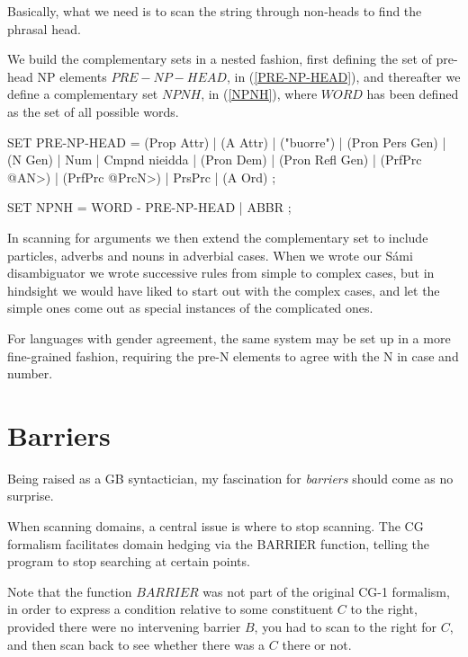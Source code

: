 \documentclass[a4paper,english]{article} %
\begin{document}
Basically, what we need is to scan the string through non-heads to find the phrasal head.%

We build the complementary sets in a nested fashion, first defining the set of pre-head NP elements $PRE-NP-HEAD$, in (\ref{PRE-NP-HEAD}), and thereafter we define a complementary set $NPNH$, in (\ref{NPNH}), where $WORD$ has been defined as the set of all possible words.%

\begin{example}\label{PRE-NP-HEAD}
SET PRE-NP-HEAD = (Prop Attr) | (A Attr) | ("buorre") | (Pron Pers Gen) | (N Gen) | Num | Cmpnd nieidda | (Pron Dem) | (Pron Refl Gen) | (PrfPrc @AN>) | (PrfPrc @PrcN>) | PrsPrc | (A Ord) ; \\
\end{example}
\begin{example}\label{NPNH}
SET NPNH = WORD - PRE-NP-HEAD | ABBR ; \\                 
\end{example}

In scanning for arguments we then extend the complementary set to include particles, adverbs and nouns in adverbial cases. When we wrote our Sámi disambiguator we wrote successive rules from simple to complex cases, but in hindsight we would have liked to start out with the complex cases, and let the simple ones come out as special instances of the complicated ones.%

For languages with gender agreement, the same system may be set up in a more fine-grained fashion, requiring the pre-N elements to agree with the N in case and number.%


\section{Barriers}

Being raised as a GB syntactician, my fascination for \textit{barriers} should come as no surprise.%

When scanning domains, a central issue is where to stop scanning. The CG formalism facilitates domain hedging via the BARRIER function, telling the program to stop searching at certain points.%

Note that the function $BARRIER$ was not part of the original CG-1 formalism, in order to express a condition relative to some constituent $C$ to the right, provided there were no intervening barrier $B$, you had to scan to the right for $C$, and then scan back to see whether there was a $C$ there or not.%
\end{document}
